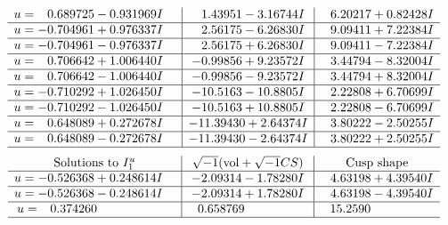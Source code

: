 \documentclass[1p]{elsarticle_modified}
\theoremstyle{definition}
\newcommand{\I}{\sqrt{-1}}
\begin{document}
$$\begin{array}{c|c|c}
\begin{aligned}
u &= \phantom{-}0.689725 - 0.931969 I\end{aligned}
 & \phantom{-}1.43951 - 3.16744 I & \phantom{-}6.20217 + 0.82428 I \\ \hline\begin{aligned}
u &= -0.704961 + 0.976337 I\end{aligned}
 & \phantom{-}2.56175 - 6.26830 I & \phantom{-}9.09411 + 7.22384 I \\ \hline\begin{aligned}
u &= -0.704961 - 0.976337 I\end{aligned}
 & \phantom{-}2.56175 + 6.26830 I & \phantom{-}9.09411 - 7.22384 I \\ \hline\begin{aligned}
u &= \phantom{-}0.706642 + 1.006440 I\end{aligned}
 & -0.99856 + 9.23572 I & \phantom{-}3.44794 - 8.32004 I \\ \hline\begin{aligned}
u &= \phantom{-}0.706642 - 1.006440 I\end{aligned}
 & -0.99856 - 9.23572 I & \phantom{-}3.44794 + 8.32004 I \\ \hline\begin{aligned}
u &= -0.710292 + 1.026450 I\end{aligned}
 & -10.5163 - 10.8805 I & \phantom{-}2.22808 + 6.70699 I \\ \hline\begin{aligned}
u &= -0.710292 - 1.026450 I\end{aligned}
 & -10.5163 + 10.8805 I & \phantom{-}2.22808 - 6.70699 I \\ \hline\begin{aligned}
u &= \phantom{-}0.648089 + 0.272678 I\end{aligned}
 & -11.39430 + 2.64374 I & \phantom{-}3.80222 - 2.50255 I \\ \hline\begin{aligned}
u &= \phantom{-}0.648089 - 0.272678 I\end{aligned}
 & -11.39430 - 2.64374 I & \phantom{-}3.80222 + 2.50255 I\\
 \hline 
 \end{array}$$\newpage$$\begin{array}{c|c|c}  
\text{Solutions to }I^u_{1}& \I (\text{vol} + \sqrt{-1}CS) & \text{Cusp shape}\\
 \hline 
\begin{aligned}
u &= -0.526368 + 0.248614 I\end{aligned}
 & -2.09314 - 1.78280 I & \phantom{-}4.63198 + 4.39540 I \\ \hline\begin{aligned}
u &= -0.526368 - 0.248614 I\end{aligned}
 & -2.09314 + 1.78280 I & \phantom{-}4.63198 - 4.39540 I \\ \hline\begin{aligned}
u &= \phantom{-}0.374260\phantom{ +0.000000I}\end{aligned}
 & \phantom{-}0.658769\phantom{ +0.000000I} & \phantom{-}15.2590\phantom{ +0.000000I}\\
 \hline 
 \end{array}$$\newpage
\end{document}
